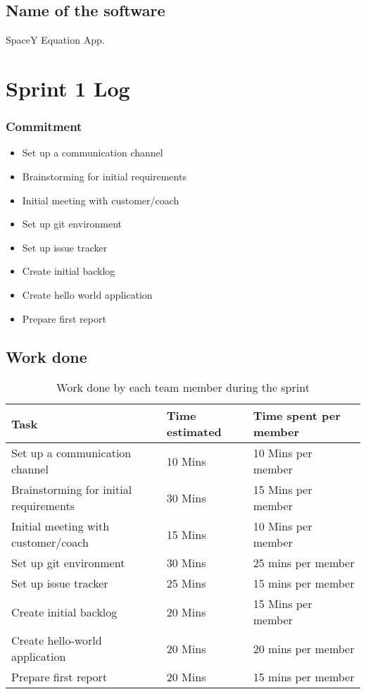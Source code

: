 \documentclass[14]{article}
\begin{document}
\subsection{Name of the software}
SpaceY Equation App.
\section{Sprint 1 Log}
\subsubsection{Commitment}
\begin{itemize}
    \item Set up a communication channel
    \item Brainstorming for initial requirements
    \item Initial meeting with customer/coach
    \item Set up git environment
    \item Set up issue tracker
    \item Create initial backlog
    \item Create hello world application
    \item Prepare first report
\end{itemize}
\subsection{Work done}
\begin{table}[H]
    \centering
    \begin{tabular}{l|l|l|}
        \textbf{Task} & \textbf{Time estimated} & \textbf{Time spent per member}  \\
        \hline
        Set up a communication channel & 10 Mins & 10 Mins per member \\
        Brainstorming for initial requirements & 30 Mins & 15 Mins per member\\
        Initial meeting with customer/coach & 15 Mins & 10 Mins per member \\
        Set up git environment & 30 Mins & 25 mins per member \\
        Set up issue tracker & 25 Mins & 15 mins per member \\
        Create initial backlog & 20 Mins & 15 Mins per member \\
        Create hello-world application & 20 Mins & 20 mins per member  \\
        Prepare first report & 20 Mins & 15 mins per member \\
    \end{tabular}
    \caption{Work done by each team member during the sprint}
    \label{tab:my_label}
\end{table}
\end{document}
